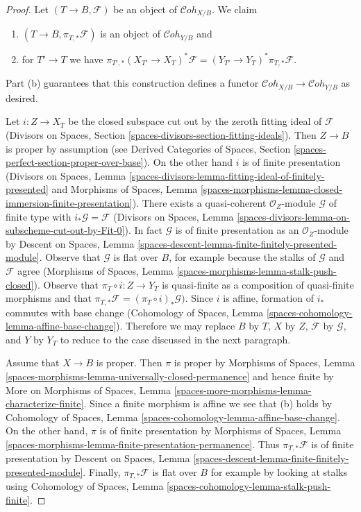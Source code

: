\documentclass[10pt,a4paper]{amsart}
\theoremstyle{plain}
\theoremstyle{definition}
\theoremstyle{remark}
\numberwithin{equation}{subsection}
\def\Cohstack{\mathcal{C}\!\mathit{oh}}
\begin{document}
\begin{proof}
Let $(T \to B, \mathcal{F})$ be an object of $\Cohstack_{X/B}$.
We claim
\begin{enumerate}
\item[(a)] $(T \to B, \pi_{T, *}\mathcal{F})$ is an object
of $\Cohstack_{Y/B}$ and
\item[(b)] for $T' \to T$ we have
$\pi_{T', *}(X_{T'} \to X_T)^*\mathcal{F} =
(Y_{T'} \to Y_T)^*\pi_{T, *}\mathcal{F}$.
\end{enumerate}
Part (b) guarantees that this construction defines a functor
$\Cohstack_{X/B} \to \Cohstack_{Y/B}$ as desired.

\medskip\noindent
Let $i : Z \to X_T$ be the closed subspace cut out by the zeroth
fitting ideal of $\mathcal{F}$
(Divisors on Spaces, Section
\ref{spaces-divisors-section-fitting-ideals}).
Then $Z \to B$ is proper by assumption (see
Derived Categories of Spaces, Section
\ref{spaces-perfect-section-proper-over-base}).
On the other hand $i$ is of finite presentation
(Divisors on Spaces, Lemma
\ref{spaces-divisors-lemma-fitting-ideal-of-finitely-presented} and
Morphisms of Spaces, Lemma
\ref{spaces-morphisms-lemma-closed-immersion-finite-presentation}).
There exists a quasi-coherent $\mathcal{O}_Z$-module
$\mathcal{G}$ of finite type with $i_*\mathcal{G} = \mathcal{F}$
(Divisors on Spaces, Lemma
\ref{spaces-divisors-lemma-on-subscheme-cut-out-by-Fit-0}).
In fact $\mathcal{G}$ is of finite presentation as an $\mathcal{O}_Z$-module
by Descent on Spaces, Lemma
\ref{spaces-descent-lemma-finite-finitely-presented-module}.
Observe that $\mathcal{G}$ is flat over $B$, for example
because the stalks of $\mathcal{G}$ and $\mathcal{F}$ agree
(Morphisms of Spaces, Lemma \ref{spaces-morphisms-lemma-stalk-push-closed}).
Observe that $\pi_T \circ i : Z \to Y_T$ is quasi-finite as a composition
of quasi-finite morphisms and that
$\pi_{T, *}\mathcal{F} = (\pi_T \circ i)_*\mathcal{G})$.
Since $i$ is affine, formation of $i_*$ commutes with base change
(Cohomology of Spaces, Lemma \ref{spaces-cohomology-lemma-affine-base-change}).
Therefore we may replace $B$ by $T$, $X$ by $Z$,
$\mathcal{F}$ by $\mathcal{G}$, and $Y$ by $Y_T$
to reduce to the case discussed in the next paragraph.

\medskip\noindent
Assume that $X \to B$ is proper. Then $\pi$ is proper
by Morphisms of Spaces, Lemma
\ref{spaces-morphisms-lemma-universally-closed-permanence}
and hence finite by
More on Morphisms of Spaces,
Lemma \ref{spaces-more-morphisms-lemma-characterize-finite}.
Since a finite morphism is affine we see that (b) holds by
Cohomology of Spaces, Lemma \ref{spaces-cohomology-lemma-affine-base-change}.
On the other hand, $\pi$ is of finite presentation by
Morphisms of Spaces, Lemma
\ref{spaces-morphisms-lemma-finite-presentation-permanence}.
Thus $\pi_{T, *}\mathcal{F}$ is of finite presentation by
Descent on Spaces, Lemma
\ref{spaces-descent-lemma-finite-finitely-presented-module}.
Finally, $\pi_{T, *}\mathcal{F} $ is flat over $B$ for example
by looking at stalks using
Cohomology of Spaces, Lemma \ref{spaces-cohomology-lemma-stalk-push-finite}.
\end{proof}
\end{document}
